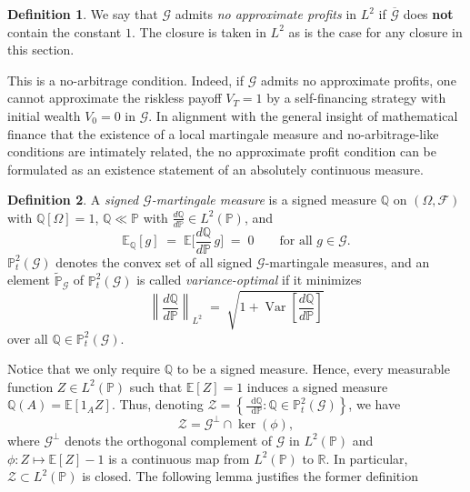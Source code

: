 \documentclass[11pt,a4paper,twoside,openany]{report}
\newcommand{\diff}{\mathop{}\!\mathrm{d}}
\theoremstyle{plain} %
\theoremstyle{definition} %
\newtheorem{definition}[definition]{Definition}
\theoremstyle{remark} %
\begin{document}
\begin{definition}
    We say that \(\mathcal{G}\) admits \textit{no approximate profits} in \(L^2\) if \(\overline{\mathcal{G}}\) does \textbf{not} contain the constant \(1\). The closure is taken in \(L^2\) as is the case for any closure in this section.
\end{definition}
This is a no-arbitrage condition. Indeed, if \(\mathcal{G}\) admits no approximate profits, one cannot approximate the riskless payoff \(V_T=1\) by a self-financing strategy with initial wealth \(V_0=0\) in \(\mathcal{G}\). In alignment with the general insight of mathematical finance that the existence of a local martingale measure and no-arbitrage-like conditions are intimately related, the no approximate profit condition can be formulated as an existence statement of an absolutely continuous measure.
\begin{definition}
A \emph{signed $\mathcal{G}$-martingale measure} is a signed measure $\mathbb{Q}$ on
$(\Omega,\mathcal{F})$ with $\mathbb{Q}[\Omega]=1$, $\mathbb{Q}\ll \mathbb{P}$ with $\frac{d\mathbb{Q}}{d\mathbb{P}}\in L^2(\mathbb{P})$, and
\[
\mathbb{E}_\mathbb{Q}[g] \;=\; \mathbb{E}\!\bigg[\frac{d\mathbb{Q}}{d\mathbb{P}}\,g\bigg] \;=\; 0
\qquad\text{for all } g\in\mathcal{G}.
\]
$\mathbb{P}^2_t(\mathcal{G})$ denotes the convex set of all signed
$\mathcal{G}$-martingale measures, and an element $\widetilde{\mathbb{P}}_{\mathcal{G}}$
of $\mathbb{P}^2_t(\mathcal{G})$ is called \emph{variance-optimal} if it minimizes
\[
\left\|\frac{d\mathbb{Q}}{d\mathbb{P}}\right\|_{L^2}
\;=\;
\sqrt{1+\operatorname{Var}\!\left[\frac{d\mathbb{Q}}{d\mathbb{P}}\right]}
\]
over all $\mathbb{Q}\in\mathbb{P}^2_t(\mathcal{G})$.
\end{definition}
Notice that we only require \(\mathbb{Q}\) to be a signed measure. Hence, every measurable function \(Z\in L^2(\mathbb{P})\) such that \(\mathbb{E}[Z]=1\) induces a signed measure \(\mathbb{Q}(A)=\mathbb{E}[1_AZ]\). Thus, denoting \(\mathcal{Z}=\left\{\frac{\diff \mathbb{Q}}{\diff \mathbb{P}}:\mathbb{Q}\in\mathbb{\mathbb{P}}^2_t(\mathcal{G})\right\}\), we have 
\begin{equation}
    \mathcal{Z}=\mathcal{G}^{\perp}\cap \ker(\phi),
\end{equation}
where \(\mathcal{G}^{\perp}\) denots the orthogonal complement of \(\mathcal{G}\) in \(L^2(\mathbb{P})\) and \(\phi:Z\mapsto\mathbb{E}[Z]-1\) is a continuous map from \(L^2(\mathbb{P})\) to \(\mathbb{R}\). In particular, \(\mathcal{Z}\subset L^2(\mathbb{P})\) is closed.
\bigbreak
The following lemma justifies the former definition
\end{document}
